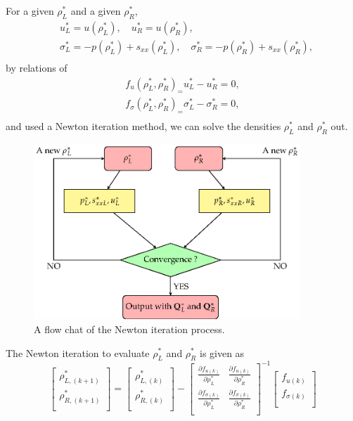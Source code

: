 \documentclass[review]{elsarticle}
\begin{document}
For a given  $\rho_L^*$ and a given $\rho_R^*$,
\begin{equation}
  \begin{aligned}
 & u_L^* = u(\rho_L^*),\quad u_R^*= u(\rho_R^*) ,\\
 & \sigma_L^* = -p(\rho_L^*)+s_{xx}(\rho_L^*),\quad \sigma_R^*= -p(\rho_R^*)+s_{xx}(\rho_R^*) ,\\
\end{aligned}
\end{equation}
 by relations of 
\begin{equation}
  \begin{aligned}
	f_u(\rho_L^*,\rho_R^*)_=  u_L^* -u_R^* =0,\\ 
	f_\sigma(\rho_L^*,\rho_R^*)_=  \sigma_L^* -\sigma_R^* =0,\\ 
\end{aligned}
\end{equation}
and used a Newton iteration method, we can solve the densities $\rho_L^*$ and $\rho_R^*$ out.
\begin{figure}
  \centering
  \includegraphics[width= 10cm] {Tikz-figure6.eps}
  \caption{A flow chat of the Newton iteration process.}
  \label{fig:newton}
\end{figure}

The Newton iteration to evaluate $\rho_L^*$ and $\rho_R^*$ is given as
\begin{equation}
\left[ \begin{array}{l}
 \rho _{L,(k+1)}^*\\
\rho_{R,(k+1)}^*\\
\end{array}
\right] = 
\left[ \begin{array}{l}
 \rho _{L,(k)}^*\\
\rho_{R,(k)}^*\\
\end{array}
\right]-
\left[ \begin{array}{ll}
\frac{\partial f_{u(k)}}{\partial \rho_L^*} & \frac{\partial f_{u(k)}}{\partial \rho_R^*}\\
\frac{\partial f_{\sigma(k)}}{\partial \rho_L^*} & \frac{\partial f_{\sigma(k)}}{\partial \rho_R^*}\\
\end{array}
\right]^{-1}
\left[ \begin{array}{l}
f_{u(k)}\\
f_{\sigma(k)}\\
\end{array}
\right]
\end{equation}
\end{document}
